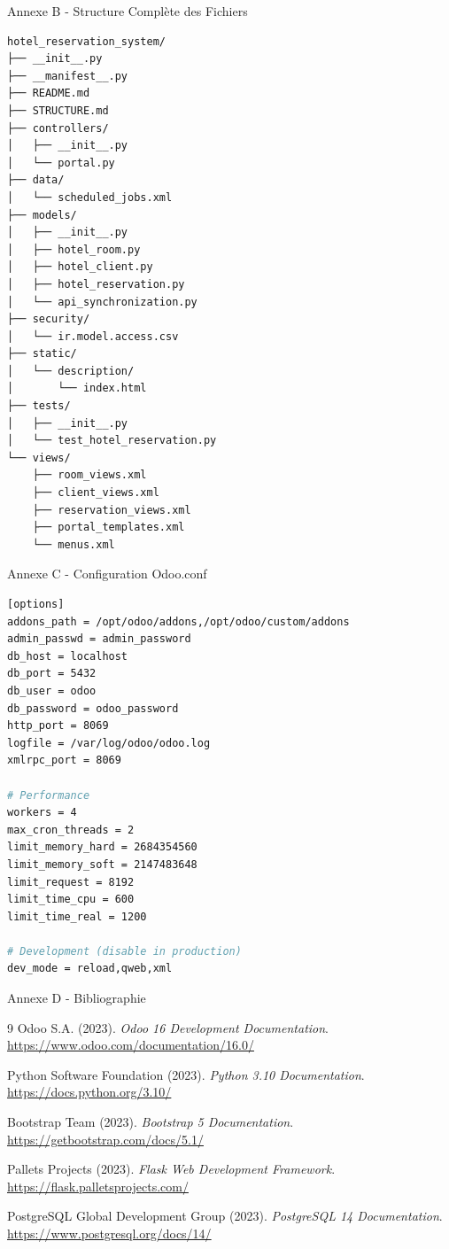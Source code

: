 \documentclass[aspectratio=169]{beamer}
\begin{document}
\begin{frame}[fragile]{Annexe B - Structure Complète des Fichiers}
    \begin{lstlisting}[language=bash]
hotel_reservation_system/
├── __init__.py
├── __manifest__.py
├── README.md
├── STRUCTURE.md
├── controllers/
│   ├── __init__.py
│   └── portal.py
├── data/
│   └── scheduled_jobs.xml
├── models/
│   ├── __init__.py
│   ├── hotel_room.py
│   ├── hotel_client.py
│   ├── hotel_reservation.py
│   └── api_synchronization.py
├── security/
│   └── ir.model.access.csv
├── static/
│   └── description/
│       └── index.html
├── tests/
│   ├── __init__.py
│   └── test_hotel_reservation.py
└── views/
    ├── room_views.xml
    ├── client_views.xml
    ├── reservation_views.xml
    ├── portal_templates.xml
    └── menus.xml
    \end{lstlisting}
\end{frame}

\begin{frame}[fragile]{Annexe C - Configuration Odoo.conf}
    \begin{lstlisting}[language=bash]
[options]
addons_path = /opt/odoo/addons,/opt/odoo/custom/addons
admin_passwd = admin_password
db_host = localhost
db_port = 5432
db_user = odoo
db_password = odoo_password
http_port = 8069
logfile = /var/log/odoo/odoo.log
xmlrpc_port = 8069

# Performance
workers = 4
max_cron_threads = 2
limit_memory_hard = 2684354560
limit_memory_soft = 2147483648
limit_request = 8192
limit_time_cpu = 600
limit_time_real = 1200

# Development (disable in production)
dev_mode = reload,qweb,xml
    \end{lstlisting}
\end{frame}

\begin{frame}{Annexe D - Bibliographie}
    \begin{thebibliography}{9}
        Odoo S.A. (2023). 
        \textit{Odoo 16 Development Documentation}.
        \url{https://www.odoo.com/documentation/16.0/}
        
        Python Software Foundation (2023).
        \textit{Python 3.10 Documentation}.
        \url{https://docs.python.org/3.10/}
        
        Bootstrap Team (2023).
        \textit{Bootstrap 5 Documentation}.
        \url{https://getbootstrap.com/docs/5.1/}
        
        Pallets Projects (2023).
        \textit{Flask Web Development Framework}.
        \url{https://flask.palletsprojects.com/}
        
        PostgreSQL Global Development Group (2023).
        \textit{PostgreSQL 14 Documentation}.
        \url{https://www.postgresql.org/docs/14/}
    \end{thebibliography}
\end{frame}
\end{document}
